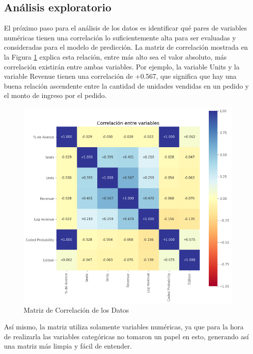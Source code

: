 \documentclass{article}
\begin{document}
        \subsection{Análisis exploratorio}
        
        El próximo paso para el análisis de los datos es identificar qué pares de variables numéricas tienen una correlación lo suficientemente alta para ser evaluadas y consideradas para el modelo de predicción. La matriz de correlación mostrada en la Figura \ref{fig:tablaCor} explica esta relación, entre más alto sea el valor absoluto, más correlación existirán entre ambas variables. Por ejemplo, la variable Units y la variable Revenue tienen una correlación de +0.567, que significa que hay una buena relación ascendente entre la cantidad de unidades vendidas en un pedido y el monto de ingreso por el pedido.

        \begin{figure}[h!]
            \centering
            \includegraphics[width = \columnwidth]{img/correlation_matrix.png}
            \caption{Matriz de Correlación de los Datos}
            \label{fig:tablaCor}
        \end{figure}
        Así mismo, la matriz utiliza solamente variables numéricas, ya que para la hora de realizarla las variables categóricas no tomaron un papel en esto, generando así una matriz más limpia y fácil de entender. 
\end{document}
